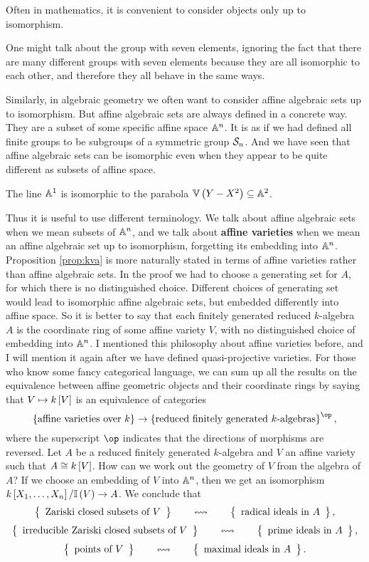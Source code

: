 Often in mathematics, it is convenient to consider objects only up to isomorphism.

\begin{example*}
One might talk about the group with seven elements, ignoring the fact that there are many different groups with seven elements because they are all isomorphic to each other, and therefore they all behave in the same ways.
\end{example*}

Similarly, in algebraic geometry we often want to consider affine algebraic sets up to isomorphism. But affine algebraic sets are always defined in a concrete way. They are a subset of some specific affine space $ \AA^n $. It is as if we had defined all finite groups to be subgroups of a symmetric group $ \SSS_n $. And we have seen that affine algebraic sets can be isomorphic even when they appear to be quite different as subsets of affine space.

\begin{example*}
The line $ \AA^1 $ is isomorphic to the parabola $ \VV\br{Y - X^2} \subseteq \AA^2 $.
\end{example*}

Thus it is useful to use different terminology. We talk about affine algebraic sets when we mean subsets of $ \AA^n $, and we talk about \textbf{affine varieties} when we mean an affine algebraic set up to isomorphism, forgetting its embedding into $ \AA^n $. Proposition \ref{prop:kva} is more naturally stated in terms of affine varieties rather than affine algebraic sets. In the proof we had to choose a generating set for $ A $, for which there is no distinguished choice. Different choices of generating set would lead to isomorphic affine algebraic sets, but embedded differently into affine space. So it is better to say that each finitely generated reduced $ k $-algebra $ A $ is the coordinate ring of some affine variety $ V $, with no distinguished choice of embedding into $ \AA^n $. I mentioned this philosophy about affine varieties before, and I will mention it again after we have defined quasi-projective varieties. For those who know some fancy categorical language, we can sum up all the results on the equivalence between affine geometric objects and their coordinate rings by saying that $ V \mapsto k\sbr{V} $ is an equivalence of categories
$$ \cbr{\text{affine varieties over} \ k} \to \cbr{\text{reduced finitely generated $ k $-algebras}}^{\op}, $$
where the superscript $ \op $ indicates that the directions of morphisms are reversed. Let $ A $ be a reduced finitely generated $ k $-algebra and $ V $ an affine variety such that $ A \cong k\sbr{V} $. How can we work out the geometry of $ V $ from the algebra of $ A $? If we choose an embedding of $ V $ into $ \AA^n $, then we get an isomorphism $ k\sbr{X_1, \dots, X_n} / \II\br{V} \to A $. We conclude that
$$ \correspondence{\text{Zariski closed subsets of} \ V}{\text{radical ideals in} \ A}, $$
$$ \correspondence{\text{irreducible Zariski closed subsets of} \ V}{\text{prime ideals in} \ A}, $$
$$ \correspondence{\text{points of} \ V}{\text{maximal ideals in} \ A}. $$

